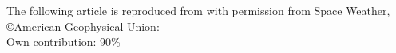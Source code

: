 
\newpage

The following article is reproduced from \textcite{Forstner-2019} with permission from Space 
Weather, \copyright American Geophysical Union:\\

\hfill Own contribution: 90\%

